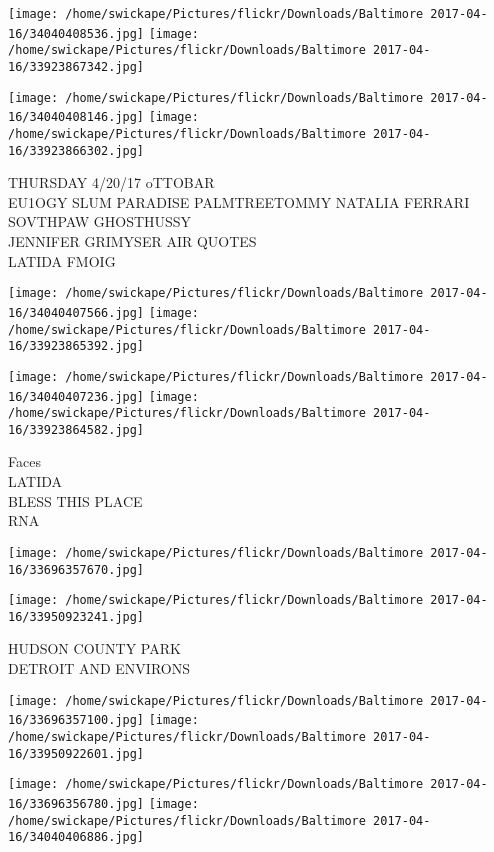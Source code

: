 \documentclass[10pt,letterpaper]{article}
\begin{document}
\texttt{[image: /home/swickape/Pictures/flickr/Downloads/Baltimore 2017-04-16/34040408536.jpg]}
\texttt{[image: /home/swickape/Pictures/flickr/Downloads/Baltimore 2017-04-16/33923867342.jpg]}

\texttt{[image: /home/swickape/Pictures/flickr/Downloads/Baltimore 2017-04-16/34040408146.jpg]}
\texttt{[image: /home/swickape/Pictures/flickr/Downloads/Baltimore 2017-04-16/33923866302.jpg]}

THURSDAY 4/20/17 oTTOBAR\\
EU1OGY SLUM PARADISE PALMTREETOMMY NATALIA FERRARI SOVTHPAW GHOSTHUSSY\\
JENNIFER GRIMYSER AIR QUOTES\\
LATIDA FMOIG
\pagebreak

\texttt{[image: /home/swickape/Pictures/flickr/Downloads/Baltimore 2017-04-16/34040407566.jpg]}
\texttt{[image: /home/swickape/Pictures/flickr/Downloads/Baltimore 2017-04-16/33923865392.jpg]}

\texttt{[image: /home/swickape/Pictures/flickr/Downloads/Baltimore 2017-04-16/34040407236.jpg]}
\texttt{[image: /home/swickape/Pictures/flickr/Downloads/Baltimore 2017-04-16/33923864582.jpg]}

Faces\\
LATIDA\\
BLESS THIS PLACE\\
RNA
\pagebreak

\texttt{[image: /home/swickape/Pictures/flickr/Downloads/Baltimore 2017-04-16/33696357670.jpg]}

\vspace{0.25in}
\texttt{[image: /home/swickape/Pictures/flickr/Downloads/Baltimore 2017-04-16/33950923241.jpg]}

HUDSON COUNTY PARK\\
DETROIT AND ENVIRONS
\pagebreak

\texttt{[image: /home/swickape/Pictures/flickr/Downloads/Baltimore 2017-04-16/33696357100.jpg]}
\texttt{[image: /home/swickape/Pictures/flickr/Downloads/Baltimore 2017-04-16/33950922601.jpg]}

\texttt{[image: /home/swickape/Pictures/flickr/Downloads/Baltimore 2017-04-16/33696356780.jpg]}
\texttt{[image: /home/swickape/Pictures/flickr/Downloads/Baltimore 2017-04-16/34040406886.jpg]}
\end{document}
